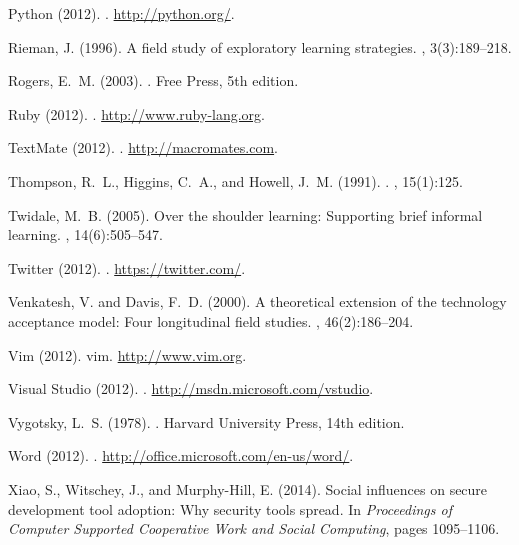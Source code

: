 \documentclass[smallextended]{svjour3}
\begin{document}
\begin{thebibliography}{}
Python (2012).
.
\newblock \url{http://python.org/}.

Rieman, J. (1996).
\newblock A field study of exploratory learning strategies.
, 3(3):189--218.

Rogers, E.~M. (2003).
.
\newblock Free Press, 5th edition.

Ruby (2012).
.
\newblock \url{http://www.ruby-lang.org}.

{TextMate} (2012).
.
\newblock \url{http://macromates.com}.

Thompson, R.~L., Higgins, C.~A., and Howell, J.~M. (1991).
.
, 15(1):125.

Twidale, M.~B. (2005).
\newblock Over the shoulder learning: Supporting brief informal learning.
, 14(6):505--547.

Twitter (2012).
.
\newblock \url{https://twitter.com/}.

Venkatesh, V. and Davis, F.~D. (2000).
\newblock A theoretical extension of the technology acceptance model: Four
  longitudinal field studies.
, 46(2):186--204.

Vim (2012).
\newblock vim.
\newblock \url{http://www.vim.org}.

Visual Studio (2012).
.
\newblock \url{http://msdn.microsoft.com/vstudio}.

Vygotsky, L.~S. (1978).
.
\newblock Harvard University Press, 14th edition.

Word (2012).
.
\newblock \url{http://office.microsoft.com/en-us/word/}.

Xiao, S., Witschey, J., and Murphy-Hill, E. (2014).
\newblock Social influences on secure development tool adoption: Why security
  tools spread.
\newblock In {\em Proceedings of Computer Supported Cooperative Work and Social
  Computing}, pages 1095--1106.

\end{thebibliography}
\end{document}
